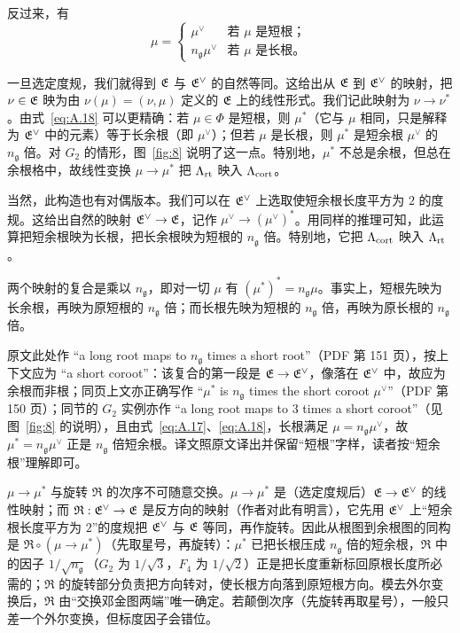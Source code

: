 反过来，有
\setcounter{equation}{17}
\begin{equation}\label{eq:A.18}
  \mu = \begin{cases} \mu^\vee & \text{若 $\mu$ 是短根；}\\ n_{\mathfrak g}{\mu^\vee} & \text{若 $\mu$ 是长根。}\end{cases}
\end{equation}

一旦选定度规，我们就得到 $\mathfrak{E}$ 与 $\mathfrak{E}^\vee$ 的自然等同。这给出从 $\mathfrak{E}$ 到 $\mathfrak{E}^\vee$ 的映射，把 $\nu\in\mathfrak{E}$ 映为由 $\nu(\mu)=(\nu,\mu)$ 定义的 $\mathfrak{E}$ 上的线性形式。我们记此映射为 $\nu\to\nu^*$。由式~\eqref{eq:A.18} 可以更精确：若 $\mu\in\Phi$ 是短根，则 $\mu^*$（它与 $\mu$ 相同，只是解释为 $\mathfrak{E}^\vee$ 中的元素）等于长余根（即 $\mu^\vee$）；但若 $\mu$ 是长根，则 $\mu^*$ 是短余根 $\mu^\vee$ 的 $n_{\mathfrak g}$ 倍。对 $ {G}_2$ 的情形，图~\ref{fig:8} 说明了这一点。特别地，$\mu^*$ 不总是余根，但总在余根格中，故线性变换 $\mu\to\mu^*$ 把 $\Lambda_{\rm rt}$ 映入 $\Lambda_{\rm cort}$。

当然，此构造也有对偶版本。我们可以在 $\mathfrak{E}^\vee$ 上选取使短余根长度平方为 $2$ 的度规。这给出自然的映射 $\mathfrak{E}^\vee\to \mathfrak{E}$，记作 $\mu^\vee\to (\mu^\vee)^*$。用同样的推理可知，此运算把短余根映为长根，把长余根映为短根的 $n_{\mathfrak g}$ 倍。特别地，它把 $\Lambda_{\rm cort}$ 映入 $\Lambda_{\rm rt}$。

两个映射的复合是乘以 $n_{\mathfrak g}$，即对一切 $\mu$ 有 $(\mu^*)^*=n_{\mathfrak g}\mu$。事实上，短根先映为长余根，再映为原短根的 $n_{\mathfrak g}$ 倍；而长根先映为短根的 $n_{\mathfrak g}$ 倍，再映为原长根的 $n_{\mathfrak g}$ 倍。

\begin{yizhu}[原文疑误]
原文此处作 “a long root maps to $n_{\mathfrak g}$ times a short root”（PDF 第 151 页），按上下文应为 “a short coroot”：该复合的第一段是 $\mathfrak{E}\to\mathfrak{E}^\vee$，像落在 $\mathfrak{E}^\vee$ 中，故应为余根而非根；同页上文亦正确写作 “$\mu^*$ is $n_{\mathfrak g}$ times the short coroot $\mu^\vee$”（PDF 第 150 页）；同节的 $G_2$ 实例亦作 “a long root maps to $3$ times a short coroot”（见图~\ref{fig:8} 的说明），且由式~\eqref{eq:A.17}、\eqref{eq:A.18}，长根满足 $\mu=n_{\mathfrak g}\mu^\vee$，故 $\mu^*=n_{\mathfrak g}\mu^\vee$ 正是 $n_{\mathfrak g}$ 倍短余根。译文照原文译出并保留“短根”字样，读者按“短余根”理解即可。
\end{yizhu}

\begin{yizhu}[易错点]
$\mu\to\mu^*$ 与旋转 $\mathfrak R$ 的次序不可随意交换。$\mu\to\mu^*$ 是（选定度规后）$\mathfrak{E}\to\mathfrak{E}^\vee$ 的线性映射；而 $\mathfrak R:\mathfrak{E}^\vee\to\mathfrak{E}$ 是反方向的映射（作者对此有明言），它先用 $\mathfrak{E}^\vee$ 上“短余根长度平方为 $2$”的度规把 $\mathfrak{E}^\vee$ 与 $\mathfrak{E}$ 等同，再作旋转。因此从根图到余根图的同构是 $\mathfrak R\circ(\mu\to\mu^*)$（先取星号，再旋转）：$\mu^*$ 已把长根压成 $n_{\mathfrak g}$ 倍的短余根，$\mathfrak R$ 中的因子 $1/\sqrt{n_{\mathfrak g}}$（$G_2$ 为 $1/\sqrt3$，$F_4$ 为 $1/\sqrt2$）正是把长度重新标回原根长度所必需的；$\mathfrak R$ 的旋转部分负责把方向转对，使长根方向落到原短根方向。模去外尔变换后，$\mathfrak R$ 由“交换邓金图两端”唯一确定。若颠倒次序（先旋转再取星号），一般只差一个外尔变换，但标度因子会错位。
\end{yizhu}

